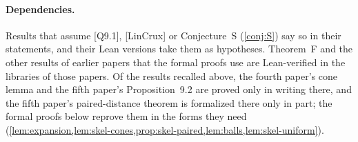 \paragraph{Dependencies.} Results that assume [Q9.1], [LinCrux] or Conjecture~S (\cref{conj:S}) say so in their
statements, and their Lean versions take them as hypotheses. Theorem~F and the other results of earlier papers that the
formal proofs use are Lean-verified in the libraries of those papers. Of the results recalled above, the fourth paper's
cone lemma and the fifth paper's Proposition~9.2 are proved only in writing there, and the fifth paper's paired-distance
theorem is formalized there only in part; the formal proofs below reprove them in the forms they need
(\cref{lem:expansion,lem:skel-cones,prop:skel-paired,lem:balls,lem:skel-uniform}).
